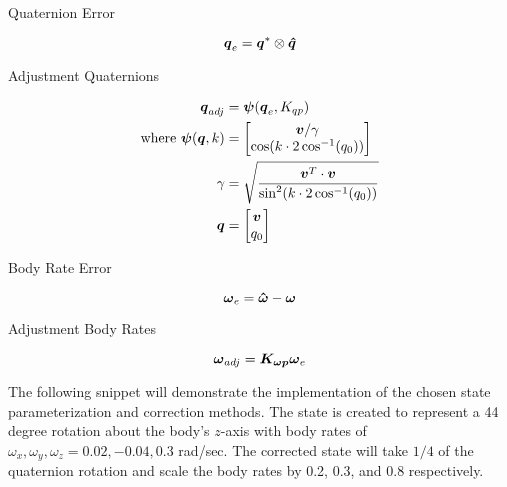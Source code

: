 Quaternion Error

\begin{equation}
  \boldsymbol{q}_e = \boldsymbol{q}^* \otimes \boldsymbol{\hat{q}}
\end{equation}

Adjustment Quaternions

\begin{equation}
  \begin{aligned}
    \boldsymbol{q}_{adj} &= \boldsymbol{\psi}(\boldsymbol{q}_e, K_{qp}) \\
    \text{where } \boldsymbol{\psi}(\boldsymbol{q}, k) &= \begin{bmatrix} \boldsymbol{v} / \gamma \\ \cos ( k \cdot 2\cos^{-1} (q_0))  \end{bmatrix} \\
    \gamma &= \sqrt{\frac{\boldsymbol{v}^T \cdot \boldsymbol{v}}{\sin^2 ( k \cdot 2\cos^{-1} (q_0))}} \\
    \boldsymbol{q} &= \begin{bmatrix} \boldsymbol{v} \\ q_0  \end{bmatrix}
  \end{aligned}
\end{equation}

Body Rate Error

\begin{equation}
  \boldsymbol{\omega}_e = \boldsymbol{\hat{\omega}} - \boldsymbol{\omega}
\end{equation}

Adjustment Body Rates

\begin{equation}
  \boldsymbol{\omega}_{adj} = \boldsymbol{K_{\omega p}} \boldsymbol{\omega}_e
\end{equation}

The following snippet will demonstrate the implementation of the chosen state parameterization and correction methods.  The state is created to represent a 44 degree rotation about the body's $z$-axis with body rates of $\omega_x, \omega_y, \omega_z = 0.02, -0.04, 0.3$ rad/sec.  The corrected state will take $1/4$ of the quaternion rotation and scale the body rates by 0.2, 0.3, and 0.8 respectively.

